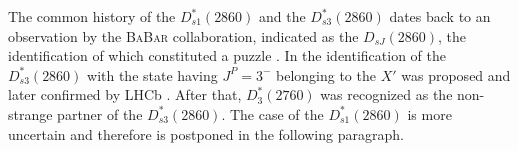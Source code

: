 The common history of the $D^*_{s 1}(2860)$ and the $D^*_{s 3}(2860)$ dates back to an observation by the \textsc{BaBar} collaboration, indicated as the $D_{s J}(2860)$, the identification of which constituted a puzzle \cite{Colangelo:2012xi}. In \cite{Colangelo:2006rq} the identification of the $D^*_{s 3}(2860)$ with the state having $J^P = 3^-$ belonging to the $X'$ was proposed and later confirmed by LHCb \cite{Aaij:2014xza}. After that, $D^*_3(2760)$ was recognized as the non-strange partner of the $D^*_{s 3}(2860)$. The case of the $D^*_{s 1}(2860)$ is more uncertain and therefore is postponed in the following paragraph.


